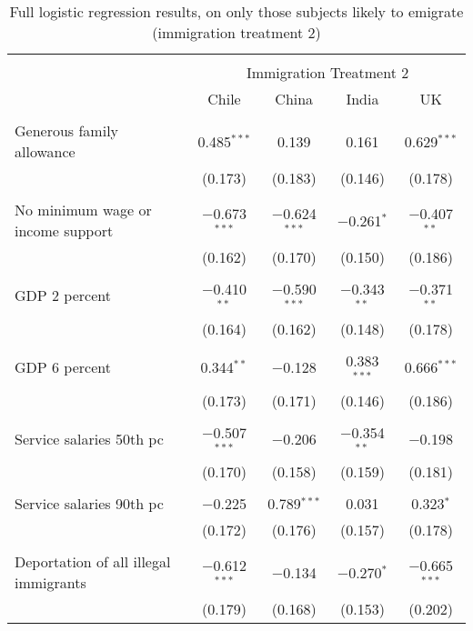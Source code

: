
\begin{table}[!htbp] \centering 
  \caption{Full logistic regression results, on only those subjects likely to emigrate (immigration treatment 2)} 
  \label{} 
\begin{tabular}{@{\extracolsep{5pt}}lcccc} 
\\[-1.8ex]\hline 
\hline \\[-1.8ex] 
 & \multicolumn{4}{c}{Immigration Treatment 2} \\ 
\cline{2-5} 
 & Chile & China & India & UK \\ 
\hline \\[-1.8ex] 
 Generous family allowance & 0.485$^{***}$ & 0.139 & 0.161 & 0.629$^{***}$ \\ 
  & (0.173) & (0.183) & (0.146) & (0.178) \\ 
  & & & & \\ 
 No minimum wage or income support & $-$0.673$^{***}$ & $-$0.624$^{***}$ & $-$0.261$^{*}$ & $-$0.407$^{**}$ \\ 
  & (0.162) & (0.170) & (0.150) & (0.186) \\ 
  & & & & \\ 
 GDP 2 percent & $-$0.410$^{**}$ & $-$0.590$^{***}$ & $-$0.343$^{**}$ & $-$0.371$^{**}$ \\ 
  & (0.164) & (0.162) & (0.148) & (0.178) \\ 
  & & & & \\ 
 GDP 6 percent & 0.344$^{**}$ & $-$0.128 & 0.383$^{***}$ & 0.666$^{***}$ \\ 
  & (0.173) & (0.171) & (0.146) & (0.186) \\ 
  & & & & \\ 
 Service salaries 50th pc & $-$0.507$^{***}$ & $-$0.206 & $-$0.354$^{**}$ & $-$0.198 \\ 
  & (0.170) & (0.158) & (0.159) & (0.181) \\ 
  & & & & \\ 
 Service salaries 90th pc & $-$0.225 & 0.789$^{***}$ & 0.031 & 0.323$^{*}$ \\ 
  & (0.172) & (0.176) & (0.157) & (0.178) \\ 
  & & & & \\ 
 Deportation of all illegal immigrants & $-$0.612$^{***}$ & $-$0.134 & $-$0.270$^{*}$ & $-$0.665$^{***}$ \\ 
  & (0.179) & (0.168) & (0.153) & (0.202) \\ 

\end{tabular}
\end{table}
